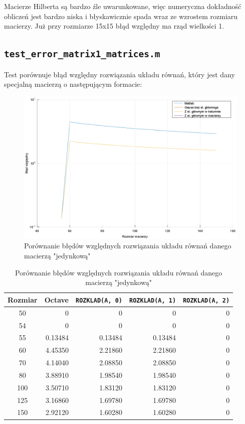 \documentclass{article}
\begin{document}
Macierze Hilberta są bardzo źle uwarunkowane, więc numeryczna dokładność obliczeń jest bardzo niska i błyskawicznie spada wraz ze wzrostem rozmiaru macierzy. Już przy rozmiarze 15x15 błąd względny ma rząd wielkości 1.

\subsection{\texttt{test\_error\_matrix1\_matrices.m}}
Test porównuje błąd względny rozwiązania układu równań, który jest dany specjalną macierzą o następującym formacie:



\begin{figure}[H]
    \centering
    \includegraphics[scale=1]{test_error_matrix1_matrices}
    \caption{Porównanie błędów względnych rozwiązania układu równań danego macierzą "jedynkową"}
\end{figure}

\begin{table}[H]
    \centering
    \begin{tabular}{ |c|r|r|r|r| }
        \hline
        Rozmiar & Octave & \verb|ROZKLAD(A, 0)| & \verb|ROZKLAD(A, 1)| & \verb|ROZKLAD(A, 2)| \\
        \hline
        50 & 0 & 0 & 0 & 0 \\
        54 & 0 & 0 & 0 & 0 \\
        55 & 0.13484 & 0.13484 & 0.13484 & 0 \\
        60 & 4.45350 & 2.21860 & 2.21860 & 0 \\
        70 & 4.14040 & 2.08850 & 2.08850 & 0 \\
        80 & 3.88910 & 1.98540 & 1.98540 & 0 \\
        100 & 3.50710 & 1.83120 & 1.83120 & 0 \\
        125 & 3.16860 & 1.69780 & 1.69780 & 0 \\
        150 & 2.92120 & 1.60280 & 1.60280 & 0 \\
        \hline
    \end{tabular}
    \caption{Porównanie błędów względnych rozwiązania układu równań danego macierzą "jedynkową"}
\end{table}
\end{document}
